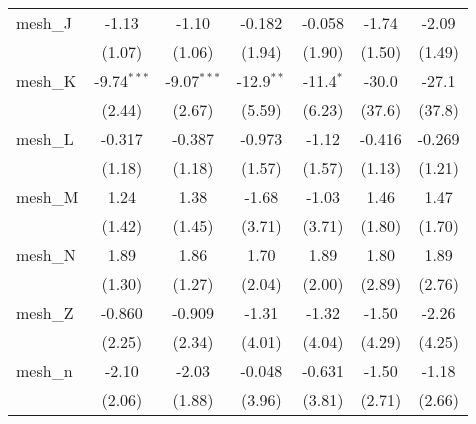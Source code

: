 \begin{tabular}{lcccccc}
   mesh\_J                                                     & -1.13         & -1.10         & -0.182        & -0.058        & -1.74        & -2.09\\   
                                                               & (1.07)        & (1.06)        & (1.94)        & (1.90)        & (1.50)       & (1.49)\\   
   mesh\_K                                                     & -9.74$^{***}$ & -9.07$^{***}$ & -12.9$^{**}$  & -11.4$^{*}$   & -30.0        & -27.1\\   
                                                               & (2.44)        & (2.67)        & (5.59)        & (6.23)        & (37.6)       & (37.8)\\   
   mesh\_L                                                     & -0.317        & -0.387        & -0.973        & -1.12         & -0.416       & -0.269\\   
                                                               & (1.18)        & (1.18)        & (1.57)        & (1.57)        & (1.13)       & (1.21)\\   
   mesh\_M                                                     & 1.24          & 1.38          & -1.68         & -1.03         & 1.46         & 1.47\\   
                                                               & (1.42)        & (1.45)        & (3.71)        & (3.71)        & (1.80)       & (1.70)\\   
   mesh\_N                                                     & 1.89          & 1.86          & 1.70          & 1.89          & 1.80         & 1.89\\   
                                                               & (1.30)        & (1.27)        & (2.04)        & (2.00)        & (2.89)       & (2.76)\\   
   mesh\_Z                                                     & -0.860        & -0.909        & -1.31         & -1.32         & -1.50        & -2.26\\   
                                                               & (2.25)        & (2.34)        & (4.01)        & (4.04)        & (4.29)       & (4.25)\\   
   mesh\_n                                                     & -2.10         & -2.03         & -0.048        & -0.631        & -1.50        & -1.18\\   
                                                               & (2.06)        & (1.88)        & (3.96)        & (3.81)        & (2.71)       & (2.66)\\   

\end{tabular}
